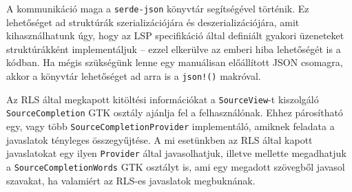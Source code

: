 A kommunikáció maga a \texttt{serde-json} könyvtár segítségével történik.
Ez lehetőséget ad struktúrák szerializációjára és deszerializációjára, amit kihasználhatunk úgy,
hogy az LSP specifikáció\cite{lsp-spec} által definiált gyakori üzeneteket struktúrákként implementáljuk --
ezzel elkerülve az emberi hiba lehetőségét is a kódban.
Ha mégis szükségünk lenne egy manuálisan előállított JSON csomagra, akkor a könyvtár lehetőséget ad 
arra is a \texttt{json!()} makróval.

Az RLS által megkapott kitöltési információkat a \texttt{SourceView}-t kiszolgáló 
\texttt{Source\-Completion} GTK osztály ajánlja fel a felhasználónak.
Ehhez párosítható egy, vagy több \texttt{Source\-Completion\-Provider} implementáló, 
amiknek feladata a javaslatok tényleges összegyűjtése.
A mi esetünkben az RLS által kapott javaslatokat egy ilyen \texttt{Provider} által javasolhatjuk,
illetve mellette megadhatjuk a \texttt{SourceCompletionWords} GTK osztályt is, ami egy megadott szövegből javasol szavakat,
ha valamiért az RLS-es javaslatok megbuknának.